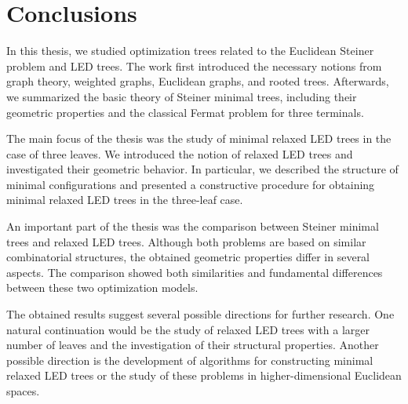 \documentclass[openany]{book}
\begin{document}
	\chapter{Conclusions}
	
	In this thesis, we studied optimization trees related to the Euclidean Steiner problem and LED trees. The work first introduced the necessary notions from graph theory, weighted graphs, Euclidean graphs, and rooted trees. Afterwards, we summarized the basic theory of Steiner minimal trees, including their geometric properties and the classical Fermat problem for three terminals.
	
	The main focus of the thesis was the study of minimal relaxed LED trees in the case of three leaves. We introduced the notion of relaxed LED trees and investigated their geometric behavior. In particular, we described the structure of minimal configurations and presented a constructive procedure for obtaining minimal relaxed LED trees in the three-leaf case.
	
	An important part of the thesis was the comparison between Steiner minimal trees and relaxed LED trees. Although both problems are based on similar combinatorial structures, the obtained geometric properties differ in several aspects. The comparison showed both similarities and fundamental differences between these two optimization models.
	
	The obtained results suggest several possible directions for further research. One natural continuation would be the study of relaxed LED trees with a larger number of leaves and the investigation of their structural properties. Another possible direction is the development of algorithms for constructing minimal relaxed LED trees or the study of these problems in higher-dimensional Euclidean spaces.

\nocite{*}
\printbibliography
\end{document}
